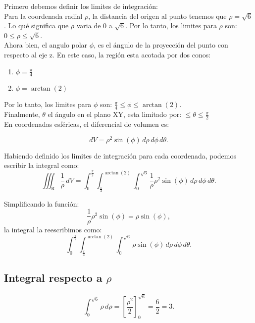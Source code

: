 \usepackage{amsmath}
\usepackage{amssymb}
\usepackage[a4paper, left=2cm, right=2cm, top=2cm, bottom=2cm]{geometry}



	Primero debemos definir los limites de integración:\\
	
	Para la coordenada radial $\rho$, la distancia del origen al punto tenemos que \( \rho = \sqrt{6} \). Lo qué significa que $\rho$ varia de 0 a $\sqrt{6}$. Por lo tanto, los limites para $\rho$ son: $0\leq \rho \leq \sqrt{6}$.\\
	
	Ahora bien, el angulo polar $\phi$, es el ángulo de la proyección del punto con respecto al eje z. En este caso, la región esta acotada por dos conos:
	
	\begin{center}
	\begin{enumerate}
	\item $ \phi = \frac{\pi}{4}$
	\item $ \phi = \arctan(2)$
	\end{enumerate}
	\end{center}
	
	Por lo tanto, los limites para $\phi$ son: $\frac{\pi}{4} \leq \phi \leq \arctan(2)$.\\
	
	Finalmente, $\theta$ el ángulo en el plano XY, esta limitado por: $\leq \theta \leq \frac{\pi}{2}$\\
	
	En coordenadas esféricas, el diferencial de volumen es:
	
	\[
	dV = \rho^2 \sin(\phi) \, d\rho \, d\phi \, d\theta.
	\]
	
	Habiendo definido los limites de integración para cada coordenada, podemos escribir la integral como:
	\[
	\iiint_{\text{R}} \frac{1}{\rho} \, dV = \int_{0}^{\frac{\pi}{2}} \int_{\frac{\pi}{4}}^{\arctan(2)} \int_{0}^{\sqrt{6}} \frac{1}{\rho} \rho^2 \sin(\phi) \, d\rho \, d\phi \, d\theta.
	\]
	
	Simplificando la función:
	\[
	\frac{1}{\rho} \rho^2 \sin(\phi) = \rho \sin(\phi),
	\]
	la integral la reescribimos como:
	\[
	\int_{0}^{\frac{\pi}{2}} \int_{\frac{\pi}{4}}^{\arctan(2)} \int_{0}^{\sqrt{6}} \rho \sin(\phi) \, d\rho \, d\phi \, d\theta.
	\]
	
	
	\subsection*{Integral respecto a \( \rho \)}
	\[
	\int_{0}^{\sqrt{6}} \rho \, d\rho = \left[ \frac{\rho^2}{2} \right]_{0}^{\sqrt{6}} = \frac{6}{2} = 3.
	\]
	
